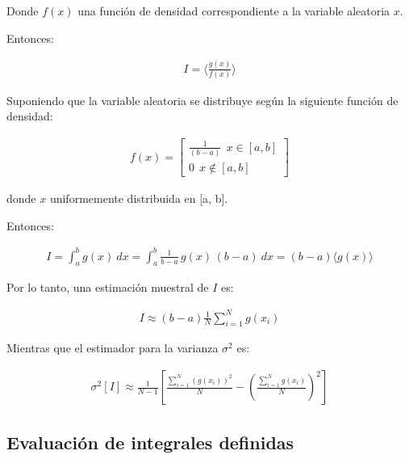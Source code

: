Donde $f(x)$ una funci\'on de densidad correspondiente a la variable aleatoria $x$.
%

Entonces:

\begin{eqnarray}
 	I = \langle \frac{g(x)}{f(x)} \rangle
 \label{EqZZZ16}
\end{eqnarray}

Suponiendo que la variable aleatoria se distribuye seg\'un la siguiente funci\'on de densidad:

\begin{eqnarray}
 	f(x) =  \left[  \begin{array}{c}
               \frac{1}{(b -a)} \: \: x \in [a, b]  \\
 	       0 \: \: x \notin [a, b]  \end{array} \right] \nonumber
 \label{EqZZZ17}
\end{eqnarray}


donde $x$ uniformemente distribuida en [a, b].

Entonces:

\begin{eqnarray}
 	I =  \int _{a} ^{b} g(x) \: d x = \int _{a} ^{b} \frac{1}{b -a} \, g(x) \, (b -a) \: d x =  (b - a) \langle g(x) \rangle
 \label{EqZZZ18}
\end{eqnarray}

Por lo tanto, una estimaci\'on muestral de $I$ es:

\begin{eqnarray}
 	I \approx (b - a) \frac{1}{N} \sum _{i=1} ^{N} g(x_{i})
 \label{EqZZZ19}
\end{eqnarray}


Mientras que el estimador para la varianza $\sigma ^{2}$ es:

\begin{eqnarray}
 	\sigma ^{2} [I] \approx \frac{1}{N - 1} \left[ \frac{\sum_{i=1} ^{N} (g(x_{i}))^{2}} {N}
 	                                               - \left(\frac{\sum_{i=1} ^{N} g(x_{i})} {N}\right) ^{2} \right]
 \label{EqZZZ20}
\end{eqnarray}


\subsection{Evaluaci\'on de integrales definidas}
\label{CapVII_7}

